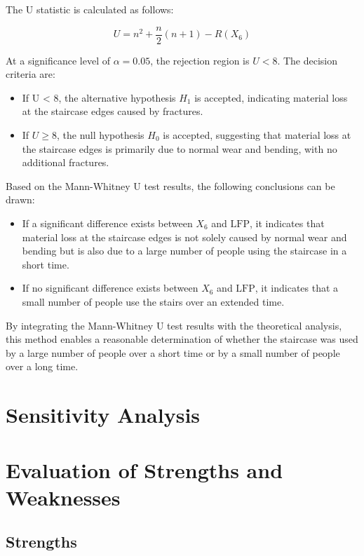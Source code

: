 \documentclass{mcmthesis}
\begin{document}
The U statistic is calculated as follows:

$$U = n^2 + \frac{n}{2}(n + 1) - R(X_6)$$

At a significance level of \(\alpha = 0.05\), the rejection region is \(U < 8\). The decision criteria are:
\begin{itemize} 

\item If U < 8, the alternative hypothesis $H_1$ is accepted, indicating material loss at the staircase edges caused by fractures.

\item If \(U \geq 8\), the null hypothesis $H_0$ is accepted, suggesting that material loss at the staircase edges is primarily due to normal wear and bending, with no additional fractures.

\end{itemize}

Based on the Mann-Whitney U test results, the following conclusions can be drawn:


\begin{itemize} 
\item If a significant difference exists between \( X_6 \) and \( \text{LFP} \), it indicates that material loss at the staircase edges is not solely caused by normal wear and bending but is also due to a large number of people using the staircase in a short time. 
\item If no significant difference exists between \( X_6 \) and \( \text{LFP} \), it indicates that a small number of people use the stairs over an extended time. 
\end{itemize}

By integrating the Mann-Whitney U test results with the theoretical analysis, this method enables a reasonable determination of whether the staircase was used by a large number of people over a short time or by a small number of people over a long time.


\section{Sensitivity Analysis}
\section{ Evaluation of Strengths and Weaknesses}%
\subsection{Strengths}
\end{document}
